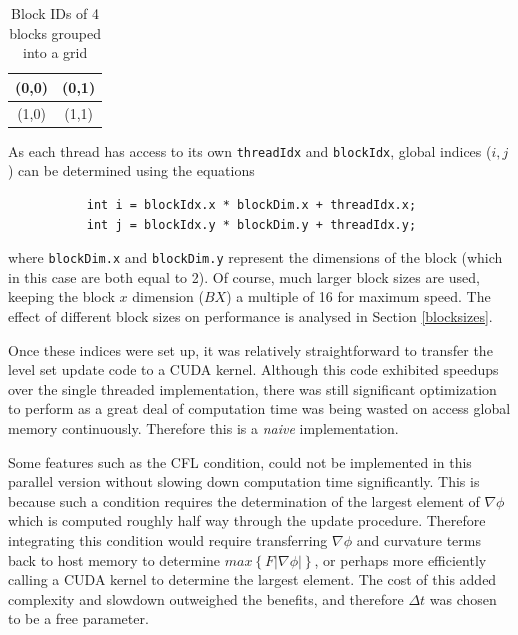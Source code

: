 \begin{table}
\begin{center}
  \begin{tabular}{ | c | c |}
    \hline
    (0,0) & (0,1)  \\ \hline
    (1,0) & (1,1)  \\ \hline
  \end{tabular}
\end{center}
\label{table:blocks}\caption{Block IDs of 4 blocks grouped into a grid}
\end{table}

As each thread has access to its own \texttt{threadIdx} and \texttt{blockIdx}, global indices ($i,j$) can be determined using the equations

\begin{verbatim}
           int i = blockIdx.x * blockDim.x + threadIdx.x;
           int j = blockIdx.y * blockDim.y + threadIdx.y;
\end{verbatim}

where \texttt{blockDim.x} and \texttt{blockDim.y} represent the dimensions of the block (which in this case are both equal to 2). Of course, much larger block sizes are used, keeping the block $x$ dimension ($BX$) a multiple of 16 for maximum speed. The effect of different block sizes on performance is analysed in Section \ref{blocksizes}.

Once these indices were set up, it was relatively straightforward to transfer the level set update code to a CUDA kernel. Although this code exhibited speedups over the single threaded implementation, there was still significant optimization to perform as a great deal of computation time was being wasted on access global memory continuously. Therefore this is a \textit{naive} implementation.

Some features such as the CFL condition, could not be implemented in this parallel version without slowing down computation time significantly. This is because such a condition requires the determination of the largest element of $\nabla\phi$ which is computed roughly half way through the update procedure. Therefore integrating this condition would require transferring $\nabla\phi$ and curvature terms back to host memory to determine $max\left\{F|\nabla\phi|\right\}$, or perhaps more efficiently calling a CUDA kernel to determine the largest element. The cost of this added complexity and slowdown outweighed the benefits, and therefore $\Delta t$ was chosen to be a free parameter.





